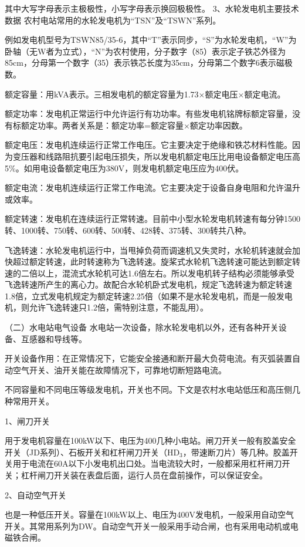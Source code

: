 \documentclass{ctexbook}
\begin{document}
其中大写字母表示主极极性，小写字母表示换回极极性。
3、水轮发电机主要技术数据
农村电站常用的水轮发电机为“TSN”及“TSWN”系列。
	
例如发电机型号为TSWN85/35-6，其中“T”表示同步，“S”为水轮发电机，“W”为卧轴（无W者为立式），“N”为农村使用，分子数字（85）表示定子铁芯外径为85cm，分母第一个数字（35）表示铁芯长度为35cm，分母第二个数字6表示磁极数。

额定容量：用kVA表示。三相发电机的额定容量为1.73$\times$额定电压$\times$额定电流。

额定功率：发电机正常运行中允许运行有功功率。有些发电机铭牌标额定容量，没有标额定功率。两者关系是：额定功率=额定容量$\times$额定功率因数。

额定电压：发电机连续运行正常工作电压。它主要决定于绝缘和铁芯材料性能。因为变压器和线路阻抗要引起电压损失，所以发电机额定电压比用电设备额定电压高5\%。如用电设备额定电压为380V，则发电机额定电压应为400伏。

额定电流：发电机连续运行正常工作电流。它主要决定于设备自身电阻和允许温升或效率。

额定转速：发电机在连续运行正常转速。目前中小型水轮发电机转速有每分钟1500转、1000转、750转、600转、500转、428转、375转、300转共八种。

飞逸转速：水轮发电机运行中，当甩掉负荷而调速机又失灵时，水轮机转速就会加快超过额定转速，此时转速称为飞逸转速。旋桨式水轮机飞逸转速可能达到额定转速的二倍以上，混流式水轮机可达1.6倍左右。所以发电机转子结构必须能够承受飞逸转速所产生的离心力。故配合水轮机卧式发电机，规定飞逸转速为额定转速1.8倍，立式发电机规定为额定转速2.25倍（如果不是水轮发电机，而是一般发电机，则允许飞逸转速只1.2倍，需特别注意，不能乱用）。

（二）水电站电气设备
水电站一次设备，除水轮发电机以外，还有各种开关设备、互感器和导线等。

开关设备作用：在正常情况下，它能安全接通和断开最大负荷电流。有灭弧装置自动空气开关、油开关能在故障情况下，可靠地切断短路电流。

不同容量和不同电压等级发电机，开关也不同。下文是农村水电站低压和高压侧几种常用开关。

1、闸刀开关

用于发电机容量在100kW以下、电压为400几种小电站。闸刀开关一般有胶盖安全开关（JD系列）、石板开关和杠杆闸刀开关（HD$_3$，带速断刀片）等几种。胶盖开关用于电流在60A以下小发电机出口处。当电流较大时，一般都采用杠杆闸刀开关；杠杆闸刀开关装在表盘后面，运行人员在盘前操作，可以保证安全。

2、自动空气开关

也是一种低压开关。容量在100kW以上、电压为400V发电机，一般采用自动空气开关。其常用系列为DW。自动空气开关一般采用手动合闸，也有采用电动机或电磁铁合闸。
\end{document}
